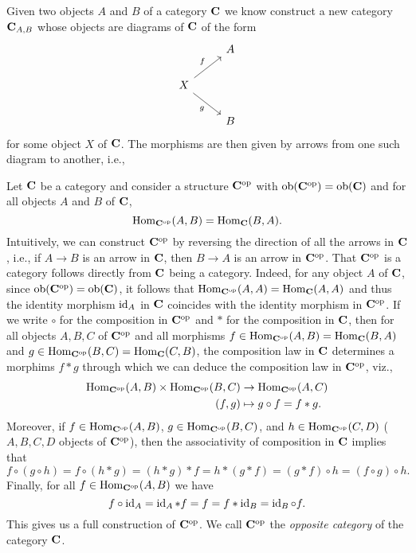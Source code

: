 \begin{example}
    Given two objects \(A\) and \(B\) of a category \(\mathbf{C}\) we know
    construct a new category \(\mathbf{C}_{A, B}\) whose objects are diagrams of
    \(\mathbf{C}\) of the form
    \[
        \begin{tikzcd}
                    & A \\
        X \arrow[rd, "g"'] \arrow[ru, "f"] &   \\
                    & B
        \end{tikzcd}
    \]
    for some object \(X\) of \(\mathbf{C}\). The morphisms are then given by
    arrows from one such diagram to another, i.e.,
    
\end{example}

\begin{example}
    Let \(\mathbf{C}\) be a category and consider a structure \(\mathbf{C}^{\mathrm{op}}\)
    with \(\operatorname{ob}(\mathbf{\mathbf{C}^{\mathrm{op}}}) = \operatorname{ob}(\mathbf{\mathbf{C}})\) and for all objects \(A\) and
    \(B\) of \(\mathbf{C}\),
    \[
        \operatorname{Hom}_{\mathbf{C}^{\mathrm{op}}}(A, B) = \operatorname{Hom}_{\mathbf{C}}(B, A).
    \]
    Intuitively, we can construct \(\mathbf{C}^{\mathrm{op}}\) by reversing the direction of
    all the arrows in \(\mathbf{C}\), i.e., if \(A \to B\) is an arrow in
    \(\mathbf{C}\), then \(B \to A\) is an arrow in \(\mathbf{C}^{\mathrm{op}}\). That
    \(\mathbf{C}^{\mathrm{op}}\) is a category follows directly from \(\mathbf{C}\) being a
    category. Indeed, for any object \(A\) of \(\mathbf{C}\), since
    \(\operatorname{ob}(\mathbf{\mathbf{C}^{\mathrm{op}}}) = \operatorname{ob}(\mathbf{\mathbf{C}})\), it follows that
    \(\operatorname{Hom}_{\mathbf{C}^{\mathrm{op}}}(A, A) = \operatorname{Hom}_{\mathbf{C}}(A, A)\) and thus the identity
    morphism \(\operatorname{id}_A\) in \(\mathbf{C}\) coincides with the identity morphism in
    \(\mathbf{C}^{\mathrm{op}}\). If we write \(\circ\) for the composition in
    \(\mathbf{C}^{\mathrm{op}}\) and \(*\) for the composition in \(\mathbf{C}\), then for all
    objects \(A, B, C\) of \(\mathbf{C}^{\mathrm{op}}\) and all morphisms \(f \in
    \operatorname{Hom}_{\mathbf{C}^{\mathrm{op}}}(A, B) = \operatorname{Hom}_{\mathbf{C}}(B,A)\) and \(g \in
    \operatorname{Hom}_{\mathbf{C}^{\mathrm{op}}}(B, C) = \operatorname{Hom}_{\mathbf{C}}(C, B)\), the composition law in
    \(\mathbf{C}\) determines a morphims \(f * g\) through which we can deduce the
    composition law in \(\mathbf{C}^{\mathrm{op}}\), viz.,
    \begin{align*}
        \operatorname{Hom}_{\mathbf{C}^{\mathrm{op}}}(A, B) \times \operatorname{Hom}_{\mathbf{C}^{\mathrm{op}}}(B, C) &\to \operatorname{Hom}_{\mathbf{C}^{\mathrm{op}}}(A, C)\\
        (f, g) &\mapsto g \circ f = f * g.
    \end{align*}
    Moreover, if \(f \in \operatorname{Hom}_{\mathbf{C}^{\mathrm{op}}}(A, B)\), \(g \in
    \operatorname{Hom}_{\mathbf{C}^{\mathrm{op}}}(B, C)\), and \(h \in \operatorname{Hom}_{\mathbf{C}^{\mathrm{op}}}(C, D)\) (\(A,
    B, C, D\) objects of \(\mathbf{C}^{\mathrm{op}}\)), then the associativity of
    composition in \(\mathbf{C}\) implies that
    \[ 
        f \circ (g \circ h) = f \circ (h * g) = (h * g) * f = h * (g * f) = (g * f) \circ h = (f \circ g) \circ h.
    \]
    Finally, for all \(f \in \operatorname{Hom}_{\mathbf{C}^{\mathrm{op}}}(A, B)\) we have
    \[
        f \circ \operatorname{id}_A = \operatorname{id}_A * f = f = f * \operatorname{id}_B = \operatorname{id}_B \circ f.
    \]
    This gives us a full construction of \(\mathbf{C}^{\mathrm{op}}\). We call
    \(\mathbf{C}^{\mathrm{op}}\) the \emph{opposite category} of the category \(\mathbf{C}\).
\end{example}

